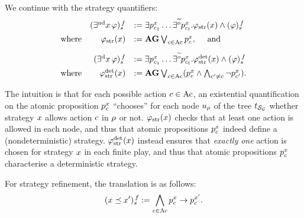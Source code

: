 We continue with the strategy quantifiers:
\[
  \begin{array}{lrl}
& \tr[f]{\Estratnd\phi}	& \egdef  \exists
                                  p_{\mov_{1}}^{\var}\ldots
                                  \exists^{\trobs{\obs}}
                                  p_{\mov_{\maxmov}}^{\var}. \phistrat
                                  \et \tr[f]{\phi}\\[5pt]
  \mbox{where} &  \phistrat & \egdef \A\always
                              \bigou_{\mov\in\Mov}p_{\mov}^{\var},
                              \quad\mbox{ and}\\[10pt]
& \tr[f]{\Estratd\phi}	& \egdef  \exists
                                  p_{\mov_{1}}^{\var}\ldots
                                  \exists^{\trobs{\obs}}
                                  p_{\mov_{\maxmov}}^{\var}. \phistratdet
                                  \et \tr[f]{\phi}\\[5pt]
  \mbox{where} & \phistratdet & \egdef
\A\always\bigou_{\mov\in\Mov}(p_{\mov}^{\var}\et\biget_{\mov'\neq\mov}\neg
p_{\mov'}^{\var}).                              
\end{array}
\]

The intuition is that for each possible action $\mov\in\Mov$, an
existential quantification on the atomic proposition $p_{\mov}^{\var}$
``chooses'' for each  node $\noeud_{\fplay}$ of the tree 
$\unfold[\KS_{\CGS}]{\sstate_{{\pos_0}}}$ whether strategy $\var$
allows action $\mov$ in $\fplay$ or not. 
$\phistrat$  checks that at least one action is allowed in each
node, and thus that atomic propositions
$p_{\mov}^{\var}$ indeed define a (nondeterministic) strategy.
$\phistratdet$ instead ensures that \emph{exactly one} action is chosen for strategy $\var$  in each finite
play, and thus that atomic propositions
$p_{\mov}^{\var}$  characterise a
deterministic strategy.

For strategy refinement, the translation is as follows:
\[\tr[f]{\var \refines \var'} \egdef \biget_{\mov\in\Mov} p_\mov^\var
  \impl p_\mov^{\var'}.\]

